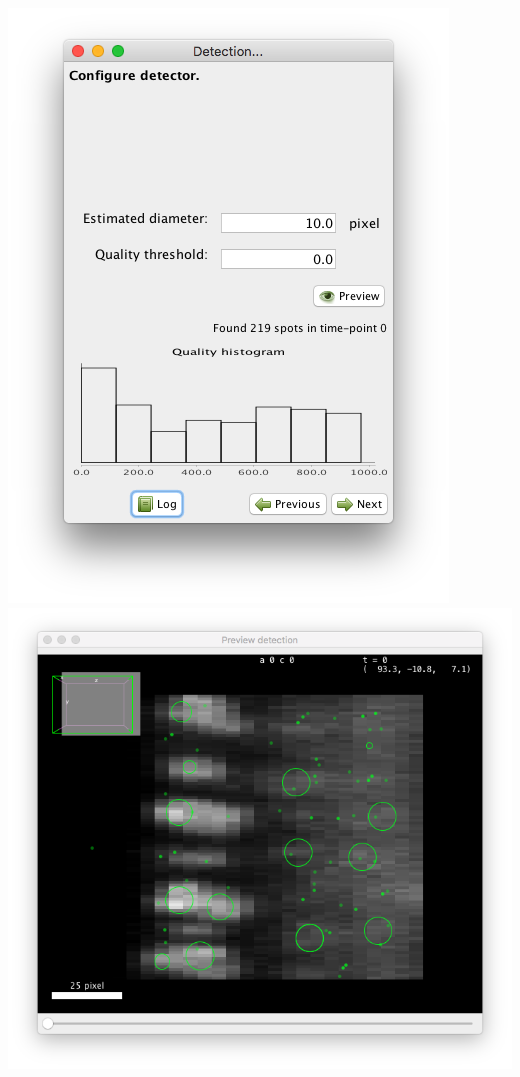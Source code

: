 \begin{center}
         \includegraphics[height=0.25\textheight]{figures/Mastodon_DoGconfig1.png}
         \includegraphics[height=0.25\textheight]{figures/Mastodon_DoGconfig2.png}
\end{center}

